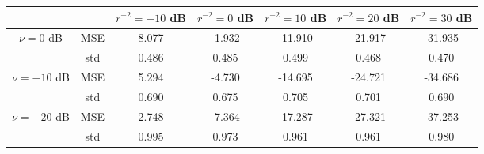\begin{tabular}{ccccccc}
\toprule
             &     &  $r^{-2}=-10$ dB &  $r^{-2}=0$ dB &  $r^{-2}=10$ dB &  $r^{-2}=20$ dB &  $r^{-2}=30$ dB \\
\midrule
$\nu=0$ dB & MSE &            8.077 &         -1.932 &         -11.910 &         -21.917 &         -31.935 \\
             & std &            0.486 &          0.485 &           0.499 &           0.468 &           0.470 \\ \hline
$\nu=-10$ dB & MSE &            5.294 &         -4.730 &         -14.695 &         -24.721 &         -34.686 \\
             & std &            0.690 &          0.675 &           0.705 &           0.701 &           0.690 \\ \hline
$\nu=-20$ dB & MSE &            2.748 &         -7.364 &         -17.287 &         -27.321 &         -37.253 \\
             & std &            0.995 &          0.973 &           0.961 &           0.961 &           0.980 \\
\bottomrule
\end{tabular}
